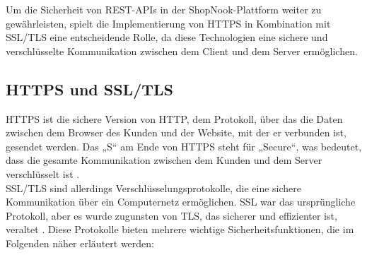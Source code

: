 Um die Sicherheit von REST-APIs in der ShopNook-Plattform weiter zu gewährleisten, spielt die Implementierung von HTTPS in Kombination mit SSL/TLS eine entscheidende Rolle, da diese Technologien eine sichere und verschlüsselte Kommunikation zwischen dem Client und dem Server ermöglichen.

\subsection{HTTPS und SSL/TLS}

HTTPS ist die sichere Version von HTTP, dem Protokoll, über das die Daten zwischen dem Browser des Kunden und der Website, mit der er verbunden ist, gesendet werden. Das „S“ am Ende von HTTPS steht für „Secure“, was bedeutet, dass die gesamte Kommunikation zwischen dem Kunden und dem Server verschlüsselt ist \cite{HTTPS:2024}.\\
SSL/TLS sind allerdings Verschlüsselungsprotokolle, die eine sichere Kommunikation über ein Computernetz ermöglichen. SSL war das ursprüngliche Protokoll, aber es wurde zugunsten von TLS, das sicherer und effizienter ist, veraltet \cite{SSL/TLS:2023}. Diese Protokolle bieten mehrere wichtige Sicherheitsfunktionen, die im Folgenden näher erläutert werden:

